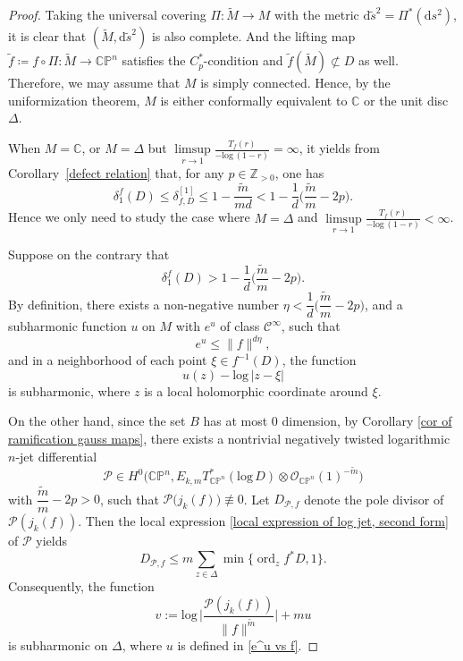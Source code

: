 \documentclass[english, 12pt]{amsart}
\DeclareMathOperator{\ord}{ord}
\def\log{\mathrm{log}\,}
\theoremstyle{plain}
\theoremstyle{remark}
\numberwithin{equation}{section}
\theoremstyle{plain}
\theoremstyle{named}
\begin{document}
\begin{proof}
	Taking the universal covering $\Pi\colon\widetilde{M}\to M$ with the metric $\mathrm{d}\widetilde{s}^2=\Pi^*\left(\mathrm{d}s^2\right)$, it is clear that $(\widetilde{M},\mathrm{d}\widetilde{s}^2)$ is also complete. And the lifting map $\widetilde{f}\coloneq f\circ \Pi\colon \widetilde{M}\to \mathbb{CP}^n$ satisfies the $C_{p}^*$-condition  and $\widetilde{f}(\widetilde{M})\not\subset D$ as well. Therefore, we may assume that $M$ is simply connected. Hence, by the uniformization theorem, $M$ is either conformally equivalent to $\mathbb{C}$ or the unit disc $\Delta$. 
	
	When $M=\mathbb{C}$, or $M=\Delta$ but $\limsup\limits_{r\rightarrow 1}\frac{T_f(r)}{-\log (1-r)}=\infty$, it yields from Corollary~\ref{defect relation} that, for any $p\in \mathbb{Z}_{>0}$, one has
	\[\delta_1^f(D)\leq\delta_{f,D}^{[1]}\leq 1-\dfrac{\widetilde{m}}{md}<1-\dfrac{1}{d}\bigg(\dfrac{\widetilde{m}}{m}-2p\bigg).\]
	Hence we only need to study the case where $M=\Delta$ and $\limsup\limits_{r\rightarrow 1}\frac{T_f(r)}{-\log (1-r)}<\infty$.
	
	Suppose on the contrary that 
	\[
	\delta_1^f(D)> 1-\dfrac{1}{d}\bigg(\dfrac{\widetilde{m}}{m}-2p\bigg).
	\]
	By definition, there exists a non-negative number $\eta<\dfrac{1}{d}\bigg(\dfrac{\widetilde{m}}{m}-2p\bigg)$, and a subharmonic function $u$ on $M$ with $e^u$ of class $\mathcal{C}^\infty$, such that
	\begin{equation}
		\label{e^u vs f}
		e^u\leq \|f\|^{d\eta},
	\end{equation}
	and in a neighborhood of each point $\xi\in f^{-1}(D)$, the function
	\[
	u(z)-
	\log|z-\xi|
	\]
	is subharmonic, where $z$ is a local holomorphic coordinate around $\xi$.
	
	On the other hand, since the set $B$ has at most 0 dimension, by Corollary \ref{cor of ramification gauss maps}, there exists a nontrivial negatively twisted logarithmic $n$-jet differential
	\[
	\mathscr{P}
	\in
	H^0
	\big(
	\mathbb{C}\mathbb{P}^n,
	E_{k,m}T_{\mathbb{C}\mathbb{P}^n}^*(\log D)
	\otimes
	\mathcal{O}_{\mathbb{C}\mathbb{P}^n}(1)^{-\widetilde{m}}
	\big)
	\]
	with $\dfrac{\tilde{m}}{m}-2p>0$, such that $\mathscr{P}\big(j_k(f)\big)\not\equiv0$.
	Let $D_{\mathscr{P},f}$ denote the pole divisor of $\mathscr{P}(j_k(f))$. Then the local expression \eqref{local expression of log jet, second form} of $\mathscr{P}$ yields
	\[
	D_{\mathscr{P},f}\leq m\sum_{z\in \Delta}\min\{\ord_zf^*D,1\}.
	\]
	Consequently, the function
	\begin{equation}
		\label{function v}
		v:=\log \bigg|\dfrac{\mathscr{P}(j_k(f))}{\|f\|^{\tilde{m}}}\bigg|+mu
	\end{equation}
	is subharmonic on $\Delta$, where $u$ is defined in \eqref{e^u vs f}.
	

\end{proof}
\end{document}

